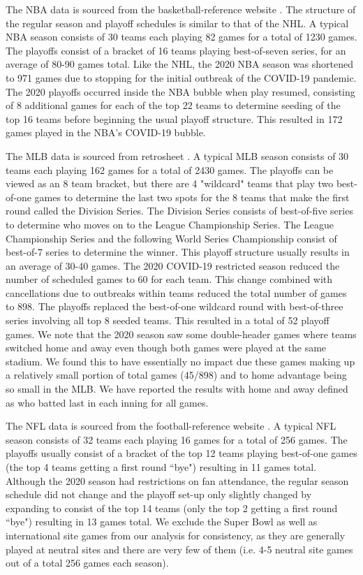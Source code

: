 The NBA data is sourced from the basketball-reference website \cite{BR2020}. The structure of the regular season and playoff schedules is similar to that of the NHL. A typical NBA season consists of 30 teams each playing 82 games for a total of 1230 games. The playoffs consist of a bracket of 16 teams playing best-of-seven series, for an average of 80-90 games total. Like the NHL, the 2020 NBA season was shortened to 971 games due to stopping for the initial outbreak of the COVID-19 pandemic. The 2020 playoffs occurred inside the NBA bubble when play resumed, consisting of 8 additional games for each of the top 22 teams to determine seeding of the top 16 teams before beginning the usual playoff structure. This resulted in 172 games played in the NBA's COVID-19 bubble.

The MLB data is sourced from retrosheet \cite{RS2020}. A typical MLB season consists of 30 teams each playing 162 games for a total of 2430 games. The playoffs can be viewed as an 8 team bracket, but there are 4 "wildcard" teams that play two best-of-one games to determine the last two spots for the 8 teams that make the first round called the Division Series. The Division Series consists of best-of-five series to determine who moves on to the League Championship Series. The League Championship Series and the following World Series Championship consist of best-of-7 series to determine the winner. This playoff structure usually results in an average of 30-40 games. The 2020 COVID-19 restricted season reduced the number of scheduled games to 60 for each team. This change combined with cancellations due to outbreaks within teams reduced the total number of games to 898. The playoffs replaced the best-of-one wildcard round with best-of-three series involving all top 8 seeded teams. This resulted in a total of 52 playoff games. We note that the 2020 season saw some double-header games where teams switched home and away even though both games were played at the same stadium. We found this to have essentially no impact due these games making up a relatively small portion of total games (45/898) and to home advantage being so small in the MLB. We have reported the results with home and away defined as who batted last in each inning for all games.

The NFL data is sourced from the football-reference website \cite{FR2020}. A typical NFL season consists of 32 teams each playing 16 games for a total of 256 games. The playoffs usually consist of a bracket of the top 12 teams playing best-of-one games (the top 4 teams getting a first round ``bye") resulting in 11 games total. Although the 2020 season had restrictions on fan attendance, the regular season schedule did not change and the playoff set-up only slightly changed by expanding to consist of the top 14 teams (only the top 2 getting a first round ``bye") resulting in 13 games total. We exclude the Super Bowl as well as international site games from our analysis for consistency, as they are generally played at neutral sites and there are very few of them (i.e. 4-5 neutral site games out of a total 256 games each season).

